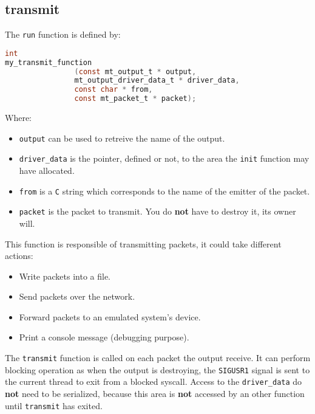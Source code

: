 %
%
\subsection{transmit}
\label{sect:output_transmit}
The \texttt{run} function is defined by:
\begin{lstlisting}[language=C,
caption=Output's transmit function prototype]
int 
my_transmit_function
                (const mt_output_t * output,
                mt_output_driver_data_t * driver_data,
                const char * from,
                const mt_packet_t * packet);
\end{lstlisting}
Where:
\begin{itemize}
\item \texttt{output} can be used to retreive the name of the output.
\item \texttt{driver\_data} is the pointer, defined or not, to the
area the \texttt{init} function may have allocated.
\item \texttt{from} is a \texttt{C} string which corresponds to the name
of the emitter of the packet.
\item \texttt{packet} is the packet to transmit. You do \textbf{not} have to
destroy it, its owner will.
\end{itemize}

This function is responsible of transmitting packets, it could take different
actions:
\begin{itemize}
\item Write packets into a file.
\item Send packets over the network.
\item Forward packets to an emulated system's device.
\item Print a console message (debugging purpose).
\end{itemize}

The \texttt{transmit} function is called on each packet the output receive. It
can perform blocking operation as when the output is destroying, the 
\texttt{SIGUSR1} signal is sent to the current thread to exit from a blocked
syscall.
Access to the \texttt{driver\_data} do \textbf{not} need to be serialized, 
because this area is \textbf{not} accessed by an other function until
\texttt{transmit} has exited.
%
%
